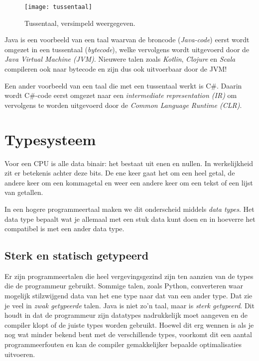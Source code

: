 \documentclass[dutch,a4paper,12pt,doubleside]{book}
\begin{document}
\begin{figure}[H]
    \centering
    \texttt{[image: tussentaal]}
    \caption{Tussentaal, versimpeld weergegeven.}
    \label{fig:tussentaal}
\end{figure}

Java is een voorbeeld van een taal waarvan 
de broncode (\textit{Java-code}) eerst wordt 
omgezet in een tussentaal (\textit{bytecode}),
welke vervolgens wordt uitgevoerd door de \textit{Java Virtual Machine (JVM)}.
Nieuwere talen zoals \textit{Kotlin}, \textit{Clojure} en \textit{Scala} 
compileren ook naar bytecode en zijn dus ook uitvoerbaar door de JVM!

Een ander voorbeeld van een taal die met een tussentaal werkt is C\#.
Daarin wordt C\#-code eerst omgezet naar een 
\textit{intermediate representation (IR)} om vervolgens te worden uitgevoerd
door de \textit{Common Language Runtime (CLR)}.

\section{Typesysteem}
Voor een CPU is alle data binair: het bestaat uit enen en nullen.
In werkelijkheid zit er betekenis achter deze bits. 
De ene keer gaat het om een heel getal, de andere keer om een kommagetal
en weer een andere keer om een tekst of een lijst van getallen.

In een hogere programmeertaal maken we dit onderscheid middels \textit{data types}.
Het data type bepaalt wat je allemaal met een stuk data kunt doen en in hoeverre het 
compatibel is met een ander data type.

\subsection{Sterk en statisch getypeerd}
Er zijn programmeertalen die heel vergevingsgezind zijn ten aanzien van de types
die de programmeur gebruikt. Sommige talen, zoals Python, converteren waar mogelijk 
stilzwijgend data van het ene type naar dat van een ander type. Dat zie je veel 
in \textit{zwak getypeerde} talen.
Java is niet zo'n taal, maar is \textit{sterk getypeerd}. 
Dit houdt in dat de programmeur zijn datatypes nadrukkelijk moet aangeven
en de compiler klopt of de juiste types worden gebruikt. Hoewel dit erg 
wennen is als je nog wat minder bekend bent met de verschillende types,
voorkomt dit een aantal programmeerfouten en kan de compiler gemakkelijker
bepaalde optimalisaties uitvoeren.
\end{document}
